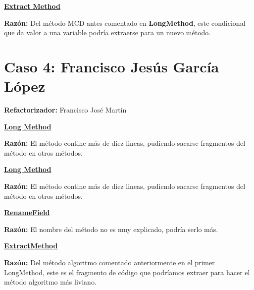 \documentclass[11pt,a4paper,oneside]{book}
\begin{document}
    
    
    \hyperref[extractmethod]{\textbf{Extract Method}}
    
    \textbf{Razón:} Del método MCD antes comentado en \textbf{LongMethod}, este condicional que da valor a una variable podría extraerse para un nuevo método.
    
    
    
    


\chapter {Caso 4: Francisco Jesús García López}
\textbf{Refactorizador:} Francisco José Martín \newline

    \hyperref[longmethod]{\textbf{Long Method}}
    
    \textbf{Razón:} El método contine más de diez lineas, pudiendo sacarse fragmentos del método en otros métodos.
    
    
    \newline
    
    \hyperref[longmethod]{\textbf{Long Method}}
    
    \textbf{Razón:} El método contine más de diez lineas, pudiendo sacarse fragmentos del método en otros métodos.
    
    
    \newline
    
    \hyperref[renamefield]{\textbf{RenameField}}
    
    \textbf{Razón:} El nombre del método no es muy explicado, podría serlo más.
    
    
    \newline
    
    \hyperref[extractmethod]{\textbf{ExtractMethod}}
    
    \textbf{Razón:} Del método algoritmo comentado anteriormente en el primer LongMethod, este es el fragmento de código que podríamos extraer para hacer el método algoritmo más liviano.
    
    
    \newline
\end{document}
